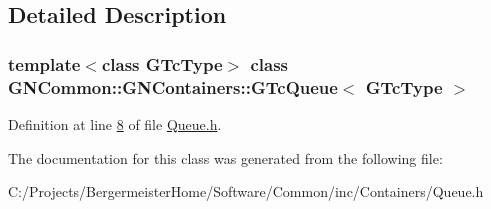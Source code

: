 \subsection{Detailed Description}
\subsubsection*{template$<$class G\+Tc\+Type$>$\newline
class G\+N\+Common\+::\+G\+N\+Containers\+::\+G\+Tc\+Queue$<$ G\+Tc\+Type $>$}



Definition at line \mbox{\hyperlink{_queue_8h_source_l00008}{8}} of file \mbox{\hyperlink{_queue_8h_source}{Queue.\+h}}.



The documentation for this class was generated from the following file\+:\begin{DoxyCompactItemize}
\item 
C\+:/\+Projects/\+Bergermeister\+Home/\+Software/\+Common/inc/\+Containers/Queue.\+h\end{DoxyCompactItemize}
